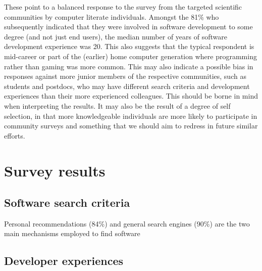 \documentclass{casicswhitepaper}
\begin{document}
These point to a balanced response to the survey from the targeted scientific communities by computer literate individuals. Amongst the 81\% who subsequently indicated that they were involved in software development to some degree (and not just end users), the median number of years of software development experience was 20. This also suggests that the typical respondent is mid-career or part of the (earlier) home computer generation where programming rather than gaming was more common. This may also indicate a possible bias in responses against more junior members of the respective communities, such as students and postdocs, who may have different search criteria and development experiences than their more experienced colleagues. This should be borne in mind when interpreting the results. It may also be the result of a degree of self selection, in that 
more knowledgeable individuals are more likely to participate in community surveys and something that we should aim to redress in future similar efforts.

\section{Survey results}

\subsection{Software search criteria}

Personal recommendations (84\%) and general search engines (90\%) are the two main mechanisms employed to find software



\subsection{Developer experiences}
\end{document}
